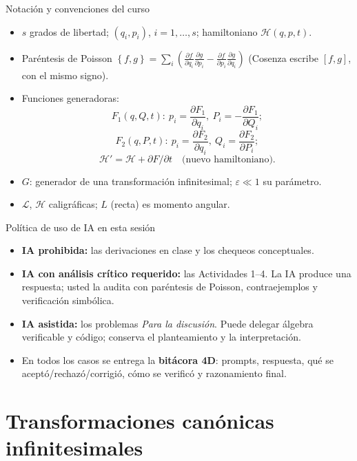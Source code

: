 \documentclass[spanish]{beamer}
\newcommand{\Lag}{\mathcal{L}}
\newcommand{\Ham}{\mathcal{H}}
\newcommand{\pd}[2]{\frac{\partial #1}{\partial #2}}
\newcommand{\pb}[2]{\left\{#1,#2\right\}}   %
\begin{document}
\begin{frame}{Notación y convenciones del curso}
\small
\begin{itemize}
  \item $s$ grados de libertad; $(q_i,p_i)$, $i=1,\ldots,s$; hamiltoniano $\Ham(q,p,t)$.
  \item Paréntesis de Poisson
        $\pb{f}{g} = \sum_i \left(\pd{f}{q_i}\pd{g}{p_i} - \pd{f}{p_i}\pd{g}{q_i}\right)$
        (Cosenza escribe $[f,g]$, con el mismo signo).
  \item Funciones generadoras:
  \[
    F_1(q,Q,t):\ p_i=\pd{F_1}{q_i},\ P_i=-\pd{F_1}{Q_i};
  \]
  \[
    F_2(q,P,t):\ p_i=\pd{F_2}{q_i},\ Q_i=\pd{F_2}{P_i};
  \]
  \[
    \Ham' = \Ham + \partial F/\partial t \quad\text{(nuevo hamiltoniano)} .
  \]
  \item $G$: generador de una transformación infinitesimal; $\varepsilon\ll 1$ su
        parámetro.
  \item $\Lag$, $\Ham$ caligráficas; $L$ (recta) es momento angular.
\end{itemize}
\end{frame}

\begin{frame}{Política de uso de IA en esta sesión}
\begin{itemize}
  \item<1-> \textbf{IA prohibida:} las derivaciones en clase y los chequeos
        conceptuales.
  \item<2-> \textbf{IA con análisis crítico requerido:} las Actividades 1--4.
        La IA produce una respuesta; usted la audita con paréntesis de Poisson,
        contraejemplos y verificación simbólica.
  \item<3-> \textbf{IA asistida:} los problemas \emph{Para la discusión}. Puede delegar
        álgebra verificable y código; conserva el planteamiento y la
        interpretación.
  \item<4-> En todos los casos se entrega la \textbf{bitácora 4D}: prompts, respuesta,
        qué se aceptó/rechazó/corrigió, cómo se verificó y razonamiento final.
\end{itemize}
\end{frame}

\section{Transformaciones canónicas infinitesimales}
\end{document}

